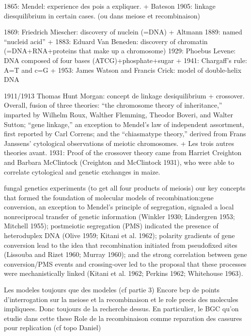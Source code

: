 





1865: Mendel: experience des pois a expliquer.
+ Bateson 1905: linkage diesquilibrium in certain cases. (ou dans meiose et recombinaison)

1869: Friedrich Miescher: discovery of nuclein (=DNA) + Altmann 1889: named “nucleid acid”
+ 1883: Eduard Van Beneden: discovery of chromatin (=DNA+RNA+proteins that make up a chromosome)
1929: Phoebus Levene: DNA composed of four bases (ATCG)+phosphate+sugar
+ 1941: Chargaff's rule: A=T and c=G
+ 1953: James Watson and Francis Crick: model of double-helix DNA

1911/1913 Thomas Hunt Morgan: concept de linkage desiquilibrium + crossover. Overall, fusion of three theories: “the chromosome theory of inheritance,” imparted by Wilhelm Roux, Walther Flemming, Theodor Boveri, and Walter Sutton; “gene linkage,” an exception to Mendel’s law of independent assortment, first reported by Carl Correns; and the “chiasmatype theory,” derived from Frans Janssens' cytological observations of meiotic chromosomes.
+ Les trois autres theories avant. 
1931: Proof of the crossover theory came from Harriet Creighton and Barbara McClintock (Creighton and McClintock 1931), who were able to correlate cytological and genetic exchanges in maize.

fungal genetics experiments (to get all four products of meiosis)
our key concepts that formed the foundation of molecular models of recombination:gene conversion, an exception to Mendel’s principle of segregation, signaled a local nonreciprocal transfer of genetic information (Winkler 1930; Lindergren 1953; Mitchell 1955); postmeiotic segregation (PMS) indicated the presence of heteroduplex DNA (Olive 1959; Kitani et al. 1962); polarity gradients of gene conversion lead to the idea that recombination initiated from pseudofixed sites (Lissouba and Rizet 1960; Murray 1960); and the strong correlation between gene conversion/PMS events and crossing-over led to the proposal that these processes were mechanistically linked (Kitani et al. 1962; Perkins 1962; Whitehouse 1963).


Les modeles toujours que des modeles (cf partie 3)
Encore bcp de points d'interrogation sur la meiose et la recombinaison et le role precis des molecules impliquees. Donc toujours de la recherche dessus.
En particulier, le BGC qu'on etudie dans cette these
Role de la recombinaison comme reparation des cassures pour replication  (cf topo Daniel)


